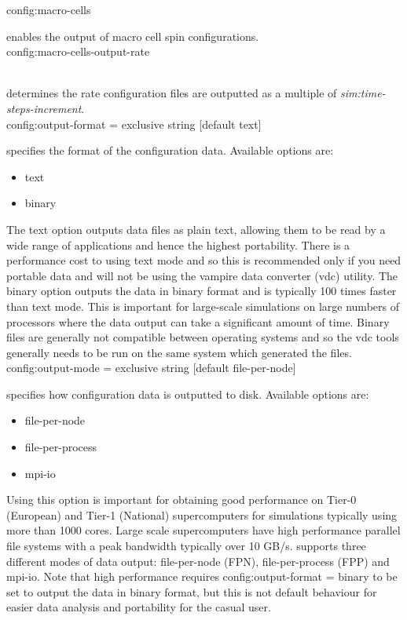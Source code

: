 {\zicf config:macro-cells}
enables the output of macro cell spin configurations.\\

{\zicf config:macro-cells-output-rate}\\
determines the rate configuration files are outputted as a multiple of \textit{sim:time-steps-increment}.\\

{\zicf config:output-format = exclusive string [default text]}
specifies the format of the configuration data. Available options are:
\begin{itemize}
  \item[] text
  \item[] binary
\end{itemize}
The text option outputs data files as plain text, allowing them to be read by
a wide range of applications and hence the highest portability. There is a
performance cost to using text mode and so this is recommended only if you need
portable data and will not be using the vampire data converter (vdc) utility. The
binary option outputs the data in binary format and is typically 100 times
faster than text mode. This is important for large-scale simulations on large
numbers of processors where the data output can take a significant amount of
time. Binary files are generally not compatible between operating systems and so
the vdc tools generally needs to be run on the same system which generated the
files.\\

{\zicf config:output-mode = exclusive string [default file-per-node]}
specifies how configuration data is outputted to disk.
Available options are:
\begin{itemize}
  \item[] file-per-node
  \item[] file-per-process
  \item[] mpi-io
\end{itemize}
Using this option is important for obtaining good performance on Tier-0
(European) and Tier-1 (National) supercomputers for simulations typically using
more than 1000 cores. Large scale supercomputers have high performance parallel
file systems with a peak bandwidth typically over 10 GB/s. \vampire supports
three different modes of data output: file-per-node (FPN), file-per-process
(FPP) and mpi-io. Note that high performance requires
config:output-format = binary to be set to output the data in binary format, but
this is not default behaviour for easier data analysis and portability for the
casual user.

